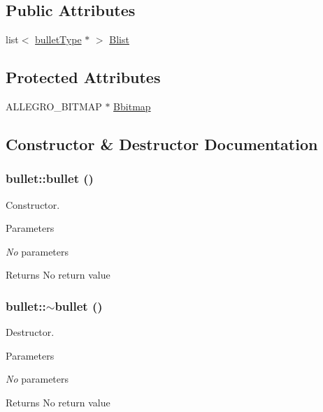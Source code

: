 \subsection*{Public Attributes}
\begin{DoxyCompactItemize}
\item 
list$<$ \hyperlink{classbulletType}{bulletType} $\ast$ $>$ \hyperlink{classbullet_ae700876dfc6875705a5c40ff4b80f94d}{Blist}
\end{DoxyCompactItemize}
\subsection*{Protected Attributes}
\begin{DoxyCompactItemize}
\item 
ALLEGRO\_\-BITMAP $\ast$ \hyperlink{classbullet_ae5e6772fcf149f67b495de01c350d83f}{Bbitmap}
\end{DoxyCompactItemize}


\subsection{Constructor \& Destructor Documentation}
\hypertarget{classbullet_a56eac386b0e6268b746bd7ed4883e1df}{
\subsubsection[{bullet}]{\setlength{\rightskip}{0pt plus 5cm}bullet::bullet ()}}
\label{classbullet_a56eac386b0e6268b746bd7ed4883e1df}


Constructor. 
\begin{DoxyParams}{Parameters}
\item[{\em No}]parameters \end{DoxyParams}
\begin{DoxyReturn}{Returns}
No return value 
\end{DoxyReturn}
\hypertarget{classbullet_a82a107fafc86d136e4a78ff13d14ceaf}{
\subsubsection[{$\sim$bullet}]{\setlength{\rightskip}{0pt plus 5cm}bullet::$\sim$bullet ()}}
\label{classbullet_a82a107fafc86d136e4a78ff13d14ceaf}


Destructor. 
\begin{DoxyParams}{Parameters}
\item[{\em No}]parameters \end{DoxyParams}
\begin{DoxyReturn}{Returns}
No return value 
\end{DoxyReturn}


